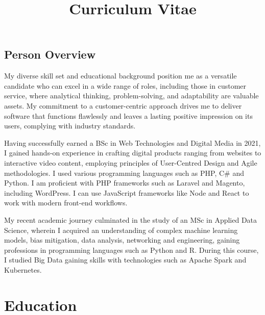 \documentclass[11pt,letterpaper,sans]{moderncv}
\title{Curriculum Vitae}
\begin{document}


%

\newpage

\makecvtitle{}

\subsection{\huge Person Overview}

\vspace{0.1in}

My diverse skill set and educational background position me as a versatile candidate who can excel in a wide range of roles, including those in customer service, where analytical thinking, problem-solving, and adaptability are valuable assets. My commitment to a customer-centric approach drives me to deliver software that functions flawlessly and leaves a lasting positive impression on its users, complying with industry standards. 

Having successfully earned a BSc in Web Technologies and Digital Media in 2021, I gained hands-on experience in crafting digital products ranging from websites to interactive video content, employing principles of User-Centred Design and Agile methodologies. I used various programming languages such as PHP, C\# and Python. I am proficient with PHP frameworks such as Laravel and Magento, including WordPress. I can use JavaScript frameworks like Node and React to work with modern front-end workflows. 

My recent academic journey culminated in the study of an MSc in Applied Data Science, wherein I acquired an understanding of complex machine learning models, bias mitigation, data analysis, networking and engineering, gaining professions in programming languages such as Python and R. During this course, I studied Big Data gaining skills with technologies such as Apache Spark and Kubernetes.




\vspace{0.1in}


\vspace{0.2in}



\section{\Huge {Education}}
\end{document}
